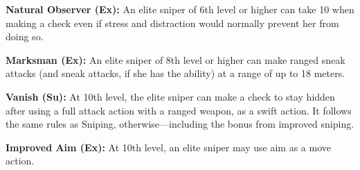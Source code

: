 {\textbf{Natural Observer (Ex):} An elite sniper of 6th level or higher can take 10 when making a  check even if stress and distraction would normally prevent her from doing so.

\textbf{Marksman (Ex):} An elite sniper of 8th level or higher can make ranged sneak attacks (and sneak attacks, if she has the ability) at a range of up to 18 meters.

\textbf{Vanish (Su):} At 10th level, the elite sniper can make a  check to stay hidden after using a full attack action with a ranged weapon, as a swift action. It follows the same rules as Sniping, otherwise---including the bonus from improved sniping.

\textbf{Improved Aim (Ex):} At 10th level, an elite sniper may use aim as a move action.
}